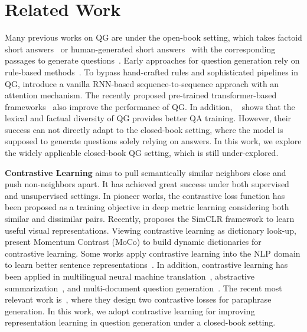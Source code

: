 \documentclass[11pt]{article}
\begin{document}
\section{Related Work}

Many previous works on QG are under the open-book setting, which takes factoid short answers~\cite{rajpurkar-etal-2016-squad} or human-generated short answers~\cite{kocisky-etal-2018-narrativeqa} with the corresponding passages to generate questions~\cite{zhang-etal-2021-review}.
Early approaches for question generation rely on rule-based methods~\cite{labutov-etal-2015-deep, khullar-etal-2018-automatic}. To bypass hand-crafted rules and sophisticated pipelines in QG, \citet{du-etal-2017-learning} introduce a vanilla RNN-based sequence-to-sequence approach with an attention mechanism. The recently proposed pre-trained transformer-based frameworks~\cite{lewis-etal-2020-bart,raffel-etal-2020-exploring} also improve the performance of QG. 
In addition, ~\citet{sultan-etal-2020-importance} shows that the lexical and factual diversity of QG provides better QA training.
However, their success can not directly adapt to the closed-book setting, where the model is supposed to generate questions solely relying on answers.
In this work, we explore the widely applicable closed-book QG setting, which is still under-explored.














\smallskip
\noindent\textbf{Contrastive Learning} aims to pull semantically similar neighbors close and push non-neighbors apart. It has achieved great success under both supervised and unsupervised settings.  
In pioneer works, the contrastive loss function \cite{hadsell2006dimensionality,chopra2005learning} has been proposed as a training objective in deep metric learning considering both similar and dissimilar pairs. Recently,  \citet{chen-etal-2020-simple} proposes the SimCLR framework to learn useful visual representations. Viewing contrastive learning as dictionary look-up, \citet{he-etal-2020-momentum} present Momentum Contrast (MoCo) to build dynamic dictionaries for contrastive learning. 
Some works apply contrastive learning into the NLP domain to learn better sentence representations~\cite{giorgi-etal-2021-declutr, gao-etal-2021-simcse}.
In addition, contrastive learning has been applied in multilingual neural machine translation~\cite{pan-etal-2021-contrastive}, abstractive summarization~\cite{liu-liu-2021-simcls}, and multi-document question generation~\cite{cho-etal-2021-contrastive}.
The recent most relevant work is~\cite{yang-etal-2021-contrastive-representation}, where they design two contrastive losses for paraphrase generation.
In this work, we adopt contrastive learning for improving representation learning in question generation under a closed-book setting. 
\end{document}
